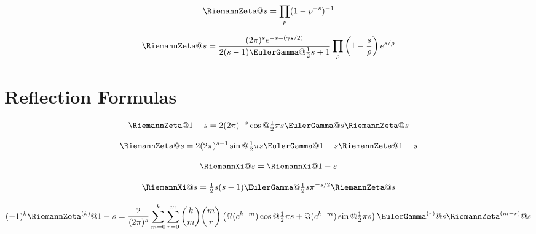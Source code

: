 \documentclass{article}
\begin{document}

\begin{equation}\label{eq:ZE.EX.PR1}
  \RiemannZeta@{s} = \prod_p (1 - p^{-s})^{-1}
\end{equation}

\begin{equation}\label{eq:ZE.EX.PR2}
  \RiemannZeta@{s}
  = \frac{(2 \cpi)^s \expe^{-s -(\EulerConstant s/2)}}
         {2(s-1) \EulerGamma@{\tfrac{1}{2} s + 1}}
    \prod_\rho \left( 1 - \frac{s}{\rho} \right) \expe^{s/\rho}
\end{equation}


\section{Reflection Formulas}\label{sec:ZE.FE}


\begin{equation}\label{eq:ZE.FE.FE1}%
  \RiemannZeta@{1-s}
  = 2 (2\cpi)^{-s} \cos@{\tfrac{1}{2} \cpi s} \EulerGamma@{s} \RiemannZeta@{s}
\end{equation}

\begin{equation}\label{eq:ZE.FE.FE2}%
  \RiemannZeta@{s}
  = 2 (2\cpi)^{s-1} \sin@{\tfrac{1}{2} \cpi s}
    \EulerGamma@{1-s} \RiemannZeta@{1-s}
\end{equation}

\begin{equation}\label{eq:ZE.FE.FE3}
  \RiemannXi@{s} = \RiemannXi@{1-s}
\end{equation}

 
\begin{equation}\label{eq:ZE.FE.FE4}
  \RiemannXi@{s}
  = \tfrac{1}{2} s (s-1) \EulerGamma@{\tfrac{1}{2} s} \cpi^{-s/2}
    \RiemannZeta@{s}
\end{equation}

\begin{equation}\label{eq:ZE.FE.DER}%
  \opminus^k \RiemannZeta^{(k)}@{1-s}
  = \frac{2}{(2\cpi)^s}
    \sum_{m=0}^k \sum_{r=0}^m
        \binom{k}{m} \binom{m}{r}
        \left( \realpart{(c^{k-m})} \cos@{\tfrac{1}{2} \cpi s}
             + \imagpart{(c^{k-m})} \sin@{\tfrac{1}{2} \cpi s} \right)
        \EulerGamma^{(r)}@{s} \RiemannZeta^{(m-r)}@{s}
\end{equation}
\end{document}
